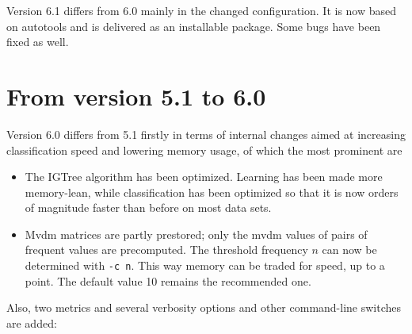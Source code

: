 \documentclass{report}
\begin{document}
Version 6.1 differs from 6.0 mainly in the changed configuration.
It is now based on autotools and is delivered as an installable package.
Some bugs have been fixed as well.

\section{From version 5.1 to 6.0}

Version 6.0 differs from 5.1 firstly in terms of internal changes
aimed at increasing classification speed and lowering memory
usage, of which the most prominent are

\begin{itemize}

\item The {\sc IGTree} algorithm has been optimized. Learning has been
  made more memory-lean, while classification has been optimized so
  that it is now orders of magnitude faster than before on most data sets.

\item {\sc Mvdm} matrices are partly prestored; only the {\sc mvdm}
  values of pairs of frequent values are precomputed. The threshold
  frequency $n$ can now be determined with {\tt -c n}. This way memory
  can be traded for speed, up to a point. The default value 10 remains
  the recommended one.

\end{itemize}

Also, two metrics and several verbosity options and other command-line
switches are added:
\end{document}
